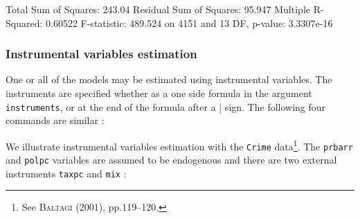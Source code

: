 \documentclass[a4paper]{article}
\begin{document}
\begin{Schunk}
\begin{Soutput}
Total Sum of Squares: 243.04
Residual Sum of Squares: 95.947
Multiple R-Squared: 0.60522
F-statistic: 489.524 on 4151 and 13 DF, p-value: 3.3307e-16
\end{Soutput}
\end{Schunk}

\subsubsection{Instrumental variables estimation}


One or all of the models may be estimated using instrumental
variables. The instruments are specified whether as a one side formula
in the argument \texttt{instruments}, or at the end of the formula
after a | sign. The following four commands are similar :

We illustrate instrumental variables estimation with the
\texttt{Crime} data\footnote{See \textsc{Baltagi} (2001),
  pp.119--120.}.  The \texttt{prbarr} and \texttt{polpc} variables are
assumed to be endogenous and there are two external instruments
\texttt{taxpc} and \texttt{mix} :
\end{document}
